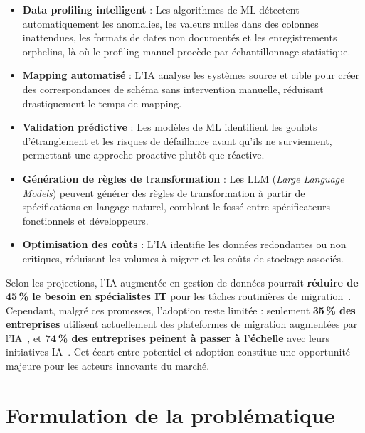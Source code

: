 \begin{itemize}
    \item \textbf{Data profiling intelligent} : Les algorithmes de ML
    détectent automatiquement les anomalies, les valeurs nulles dans des
    colonnes inattendues, les formats de dates non documentés et les
    enregistrements orphelins, là où le profiling manuel procède par
    échantillonnage statistique.

    \item \textbf{Mapping automatisé} : L'IA analyse les systèmes source
    et cible pour créer des correspondances de schéma sans intervention
    manuelle, réduisant drastiquement le temps de mapping.

    \item \textbf{Validation prédictive} : Les modèles de ML identifient
    les goulots d'étranglement et les risques de défaillance avant qu'ils
    ne surviennent, permettant une approche proactive plutôt que réactive.

    \item \textbf{Génération de règles de transformation} : Les LLM
    (\textit{Large Language Models}) peuvent générer des règles de
    transformation à partir de spécifications en langage naturel, comblant
    le fossé entre spécificateurs fonctionnels et développeurs.

    \item \textbf{Optimisation des coûts} : L'IA identifie les données
    redondantes ou non critiques, réduisant les volumes à migrer et les
    coûts de stockage associés.
\end{itemize}

Selon les projections, l'IA augmentée en gestion de données pourrait
\textbf{réduire de 45\,\% le besoin en spécialistes IT} pour les tâches
routinières de migration~\cite{ispirer_ai}. Cependant, malgré ces promesses,
l'adoption reste limitée : seulement \textbf{35\,\% des entreprises}
utilisent actuellement des plateformes de migration augmentées par
l'IA~\cite{reanin2025}, et \textbf{74\,\% des entreprises peinent à
passer à l'échelle} avec leurs initiatives IA~\cite{integrate_io_stats}.
Cet écart entre potentiel et adoption constitue une opportunité majeure
pour les acteurs innovants du marché.

\section{Formulation de la problématique}

